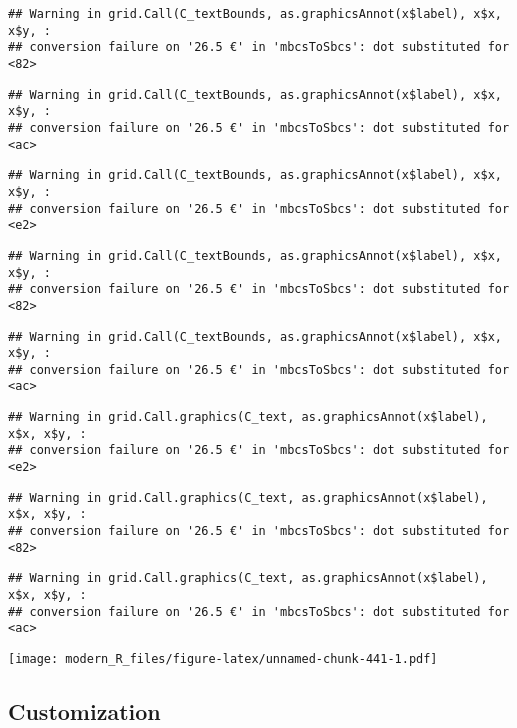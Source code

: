 \documentclass[
]{article}
\begin{document}
\begin{verbatim}
## Warning in grid.Call(C_textBounds, as.graphicsAnnot(x$label), x$x, x$y, :
## conversion failure on '26.5 €' in 'mbcsToSbcs': dot substituted for <82>
\end{verbatim}

\begin{verbatim}
## Warning in grid.Call(C_textBounds, as.graphicsAnnot(x$label), x$x, x$y, :
## conversion failure on '26.5 €' in 'mbcsToSbcs': dot substituted for <ac>
\end{verbatim}

\begin{verbatim}
## Warning in grid.Call(C_textBounds, as.graphicsAnnot(x$label), x$x, x$y, :
## conversion failure on '26.5 €' in 'mbcsToSbcs': dot substituted for <e2>
\end{verbatim}

\begin{verbatim}
## Warning in grid.Call(C_textBounds, as.graphicsAnnot(x$label), x$x, x$y, :
## conversion failure on '26.5 €' in 'mbcsToSbcs': dot substituted for <82>
\end{verbatim}

\begin{verbatim}
## Warning in grid.Call(C_textBounds, as.graphicsAnnot(x$label), x$x, x$y, :
## conversion failure on '26.5 €' in 'mbcsToSbcs': dot substituted for <ac>
\end{verbatim}

\begin{verbatim}
## Warning in grid.Call.graphics(C_text, as.graphicsAnnot(x$label), x$x, x$y, :
## conversion failure on '26.5 €' in 'mbcsToSbcs': dot substituted for <e2>
\end{verbatim}

\begin{verbatim}
## Warning in grid.Call.graphics(C_text, as.graphicsAnnot(x$label), x$x, x$y, :
## conversion failure on '26.5 €' in 'mbcsToSbcs': dot substituted for <82>
\end{verbatim}

\begin{verbatim}
## Warning in grid.Call.graphics(C_text, as.graphicsAnnot(x$label), x$x, x$y, :
## conversion failure on '26.5 €' in 'mbcsToSbcs': dot substituted for <ac>
\end{verbatim}

\texttt{[image: modern\_R\_files/figure-latex/unnamed-chunk-441-1.pdf]}

\hypertarget{customization}{%
\subsection{Customization}\label{customization}}
\end{document}
